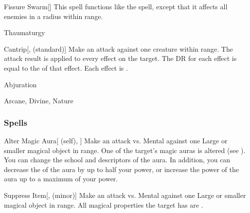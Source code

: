 \lowercase{\hypertarget{spell:Fissure Swarm}{}}\label{spell:Fissure Swarm}
\begin{ability}[\nth{6}]{\hypertarget{spell:Fissure Swarm}{Fissure Swarm}}[]
This spell functions like the  spell, except that it affects all enemies in a \areamed radius within \rngmed range.
\end{ability}
\vspace{0.25em}


\newpage
\begin{spellsection}{Thaumaturgy}


\begin{ability}{Cantrip}[,  (standard)]
Make an attack against one creature within \rngmed range.
The attack result is applied to every  effect on the target.
The DR for each effect is equal to the  of that effect.
\hit Each effect is .
\end{ability}




 Abjuration

 Arcane, Divine, Nature
\end{spellsection}


\subsubsection{Spells}


\lowercase{\hypertarget{spell:Alter Magic Aura}{}}\label{spell:Alter Magic Aura}
\begin{ability}[\nth{1}]{\hypertarget{spell:Alter Magic Aura}{Alter Magic Aura}}[ (self), ]
Make an attack vs. Mental against one Large or smaller magical object in \rngmed range.
\hit One of the target's magic auras is altered (see ).
You can change the school and descriptors of the aura.
In addition, you can decrease the  of the aura by up to half your power, or increase the power of the aura up to a maximum of your power.
\end{ability}
\vspace{0.25em}



\lowercase{\hypertarget{spell:Suppress Item}{}}\label{spell:Suppress Item}
\begin{ability}[\nth{1}]{\hypertarget{spell:Suppress Item}{Suppress Item}}[,  (minor)]
Make an attack vs. Mental against one Large or smaller magical object in \rngmed range.
\hit All magical properties the target has are .
\end{ability}
\vspace{0.25em}



